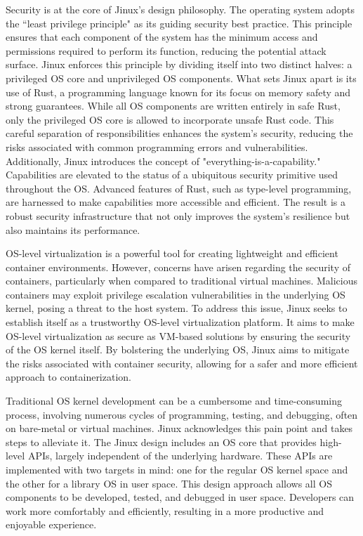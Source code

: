 \documentclass[conference]{IEEEtran}
\begin{document}
Security is at the core of Jinux's design philosophy. The operating system adopts the ``least privilege principle" as its guiding security best practice. This principle ensures that each component of the system has the minimum access and permissions required to perform its function, reducing the potential attack surface. Jinux enforces this principle by dividing itself into two distinct halves: a privileged OS core and unprivileged OS components. What sets Jinux apart is its use of Rust, a programming language known for its focus on memory safety and strong guarantees. While all OS components are written entirely in safe Rust, only the privileged OS core is allowed to incorporate unsafe Rust code. This careful separation of responsibilities enhances the system's security, reducing the risks associated with common programming errors and vulnerabilities. Additionally, Jinux introduces the concept of "everything-is-a-capability." Capabilities are elevated to the status of a ubiquitous security primitive used throughout the OS. Advanced features of Rust, such as type-level programming, are harnessed to make capabilities more accessible and efficient. The result is a robust security infrastructure that not only improves the system's resilience but also maintains its performance.

OS-level virtualization is a powerful tool for creating lightweight and efficient container environments. However, concerns have arisen regarding the security of containers, particularly when compared to traditional virtual machines. Malicious containers may exploit privilege escalation vulnerabilities in the underlying OS kernel, posing a threat to the host system. To address this issue, Jinux seeks to establish itself as a trustworthy OS-level virtualization platform. It aims to make OS-level virtualization as secure as VM-based solutions by ensuring the security of the OS kernel itself. By bolstering the underlying OS, Jinux aims to mitigate the risks associated with container security, allowing for a safer and more efficient approach to containerization.

Traditional OS kernel development can be a cumbersome and time-consuming process, involving numerous cycles of programming, testing, and debugging, often on bare-metal or virtual machines. Jinux acknowledges this pain point and takes steps to alleviate it. The Jinux design includes an OS core that provides high-level APIs, largely independent of the underlying hardware. These APIs are implemented with two targets in mind: one for the regular OS kernel space and the other for a library OS in user space. This design approach allows all OS components to be developed, tested, and debugged in user space. Developers can work more comfortably and efficiently, resulting in a more productive and enjoyable experience.
\end{document}
